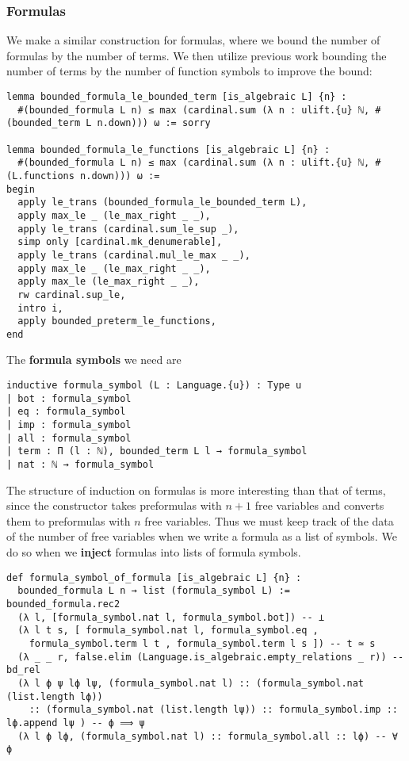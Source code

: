 \subsubsection{Formulas}

We make a similar construction for formulas,
where we bound the number of formulas by the number of terms.
We then utilize previous work bounding the number of terms by the
number of function symbols to improve the bound:
\begin{lstlisting}
lemma bounded_formula_le_bounded_term [is_algebraic L] {n} :
  #(bounded_formula L n) ≤ max (cardinal.sum (λ n : ulift.{u} ℕ, #(bounded_term L n.down))) ω := sorry

lemma bounded_formula_le_functions [is_algebraic L] {n} :
  #(bounded_formula L n) ≤ max (cardinal.sum (λ n : ulift.{u} ℕ, #(L.functions n.down))) ω :=
begin
  apply le_trans (bounded_formula_le_bounded_term L),
  apply max_le _ (le_max_right _ _),
  apply le_trans (cardinal.sum_le_sup _),
  simp only [cardinal.mk_denumerable],
  apply le_trans (cardinal.mul_le_max _ _),
  apply max_le _ (le_max_right _ _),
  apply max_le (le_max_right _ _),
  rw cardinal.sup_le,
  intro i,
  apply bounded_preterm_le_functions,
end \end{lstlisting}

The \textbf{formula symbols} we need are

\begin{lstlisting}
inductive formula_symbol (L : Language.{u}) : Type u
| bot : formula_symbol
| eq : formula_symbol
| imp : formula_symbol
| all : formula_symbol
| term : Π (l : ℕ), bounded_term L l → formula_symbol
| nat : ℕ → formula_symbol \end{lstlisting}

The structure of induction on formulas is more interesting than
that of terms, since the constructor  takes preformulas with $n + 1$ free variables and converts them to
preformulas with $n$ free variables.
Thus we must keep track of the data of the number of free variables
when we write a formula as a list of symbols.
We do so when we \textbf{inject} formulas into lists of formula symbols.

\begin{lstlisting}
def formula_symbol_of_formula [is_algebraic L] {n} :
  bounded_formula L n → list (formula_symbol L) :=
bounded_formula.rec2
  (λ l, [formula_symbol.nat l, formula_symbol.bot]) -- ⊥
  (λ l t s, [ formula_symbol.nat l, formula_symbol.eq ,
    formula_symbol.term l t , formula_symbol.term l s ]) -- t ≃ s
  (λ _ _ r, false.elim (Language.is_algebraic.empty_relations _ r)) -- bd_rel
  (λ l ϕ ψ lϕ lψ, (formula_symbol.nat l) :: (formula_symbol.nat (list.length lϕ))
    :: (formula_symbol.nat (list.length lψ)) :: formula_symbol.imp :: lϕ.append lψ ) -- ϕ ⟹ ψ
  (λ l ϕ lϕ, (formula_symbol.nat l) :: formula_symbol.all :: lϕ) -- ∀ ϕ \end{lstlisting}

